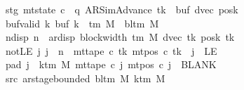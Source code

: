 \begin{isabellebody}
\ \ \ \ \ \ \ stg{\isacharcolon}{\kern0pt}\ {\isachardoublequoteopen}mt{\isacharunderscore}{\kern0pt}state\ c{}\ {\isacharequal}{\kern0pt}\ {\isacharparenleft}{\kern0pt}q{\isacharcomma}{\kern0pt}\ AR{\isacharunderscore}{\kern0pt}SimAdvance{\isacharcomma}{\kern0pt}\ tk{\isacharcomma}{\kern0pt}\ {}{\isacharcomma}{\kern0pt}\ buf{\isacharcomma}{\kern0pt}\ dvec{\isacharcomma}{\kern0pt}\ posk{\isacharparenright}{\kern0pt}{\isachardoublequoteclose}\isanewline
\ \ \ \ \ \ \ buf{\isacharunderscore}{\kern0pt}valid{\isacharcolon}{\kern0pt}\ {\isachardoublequoteopen}{\isasymforall}k{\isachardot}{\kern0pt}\ buf\ k\ {\isasymin}\ {\isasymGamma}{\isacharunderscore}{\kern0pt}tm\ M\ {\isasymunion}\ {\isacharbraceleft}{\kern0pt}bl{\isacharunderscore}{\kern0pt}tm\ M{\isacharbraceright}{\kern0pt}{\isachardoublequoteclose}\isanewline
\ \ \ \ \ \ \ ndisp{\isacharcolon}{\kern0pt}\ {\isachardoublequoteopen}n\ {\isacharless}{\kern0pt}\ ar{\isacharunderscore}{\kern0pt}disp\ {\isacharparenleft}{\kern0pt}block{\isacharunderscore}{\kern0pt}width\ {\isacharparenleft}{\kern0pt}{\isasymGamma}{\isacharunderscore}{\kern0pt}tm\ M{\isacharparenright}{\kern0pt}{\isacharparenright}{\kern0pt}\ {\isacharparenleft}{\kern0pt}dvec\ tk{\isacharparenright}{\kern0pt}\ {\isacharparenleft}{\kern0pt}posk\ tk{\isacharparenright}{\kern0pt}{\isachardoublequoteclose}\isanewline
\ \ \ \ \ \ \ notLE{\isacharcolon}{\kern0pt}\ {\isachardoublequoteopen}{\isasymAnd}j{\isachardot}{\kern0pt}\ j\ {\isacharless}{\kern0pt}\ n\ {\isasymLongrightarrow}\ mt{\isacharunderscore}{\kern0pt}tape\ c{}\ tk\ {\isacharparenleft}{\kern0pt}mt{\isacharunderscore}{\kern0pt}pos\ c{}\ tk\ {\isacharminus}{\kern0pt}\ j{\isacharparenright}{\kern0pt}\ {\isasymnoteq}\ LE{}{\isachardoublequoteclose}\isanewline
\ \ \ \ \ \ \ pad{}{\isacharcolon}{\kern0pt}\ {\isachardoublequoteopen}{\isasymforall}j\ {\isasymge}\ k{\isacharunderscore}{\kern0pt}tm\ M{\isachardot}{\kern0pt}\ mt{\isacharunderscore}{\kern0pt}tape\ c{}\ j\ {\isacharparenleft}{\kern0pt}mt{\isacharunderscore}{\kern0pt}pos\ c{}\ j{\isacharparenright}{\kern0pt}\ {\isacharequal}{\kern0pt}\ BLANK{}{\isachardoublequoteclose}\isanewline
\ \ \ \ \ \ \ src{}{\isacharcolon}{\kern0pt}\ {\isachardoublequoteopen}ar{\isacharunderscore}{\kern0pt}stage{\isacharunderscore}{\kern0pt}bounded\ {\isacharparenleft}{\kern0pt}bl{\isacharunderscore}{\kern0pt}tm\ M{\isacharparenright}{\kern0pt}\ {\isacharparenleft}{\kern0pt}k{\isacharunderscore}{\kern0pt}tm\ M{\isacharparenright}{\kern0pt}\isanewline

\end{isabellebody}
